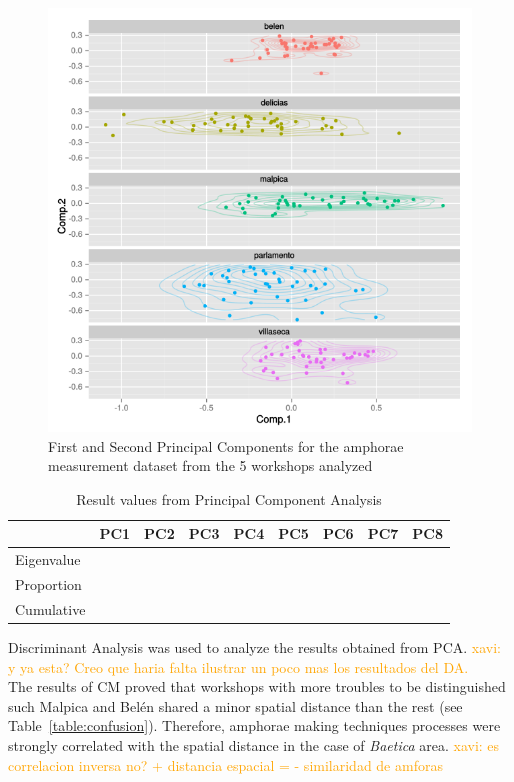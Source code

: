 \documentclass[review]{elsarticle}
\newcommand{\memo}[2]{\textcolor{#1}{#2}}
\newcommand{\xavi}[1]{\memo{orange}{xavi: #1\\}}
\begin{document}
\begin{figure}[htp]
	\centering
\includegraphics[scale=0.45]{pca.png}
\caption{First and Second Principal Components for the amphorae measurement dataset from the 5 workshops analyzed }
\label{pca}
\end{figure} 


\begin{table}[htp]
\begin{tabular}{lcccccccc}
\hline
      		&  PC1 & PC2	& PC3 & PC4 & PC5 & PC6 & PC7 & PC8     \\ \hline
Eigenvalue  	& 	   &		&	  &  	&	  &	    &     &           \\
Proportion  & 	   &		&	  &   	&	  &	    &     &           \\
Cumulative  &       &    &     &     &     &     &     &           \\

\end{tabular}
\caption{Result values from Principal Component Analysis}
\label{table:spatgeo}
\end{table}

Discriminant Analysis was used to analyze the results obtained from PCA. \xavi{y ya esta? Creo que haria falta ilustrar un poco mas los resultados del DA.} The results of CM proved that workshops with more troubles to be distinguished such Malpica and Bel\'en shared a minor spatial distance than the rest (see Table~\ref{table:confusion}). Therefore, amphorae making techniques processes were strongly correlated with the spatial distance in the case of \textit{Baetica} area. \xavi{es correlacion inversa no? + distancia espacial = - similaridad de amforas}
\end{document}
